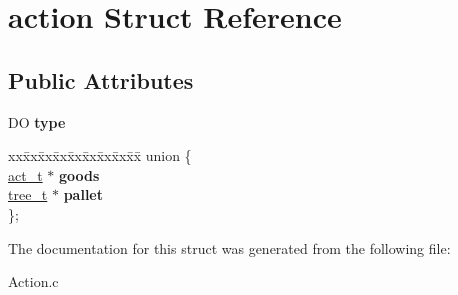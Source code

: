 \hypertarget{structaction}{}\section{action Struct Reference}
\label{structaction}
\subsection*{Public Attributes}
\begin{DoxyCompactItemize}
\item 
\hypertarget{structaction_adcdcb1b4bec8aa79b037f92903e0157a}{}D\+O {\bfseries type}\label{structaction_adcdcb1b4bec8aa79b037f92903e0157a}

\item 
\hypertarget{structaction_aae6eafa12e08fadd285f6b5a1bdc830c}{}\begin{tabbing}
xx\=xx\=xx\=xx\=xx\=xx\=xx\=xx\=xx\=\kill
union \{\\
\>\hyperlink{structact}{act\_t} $\ast$ {\bfseries goods}\\
\>\hyperlink{structtree}{tree\_t} $\ast$ {\bfseries pallet}\\
\}; \label{structaction_aae6eafa12e08fadd285f6b5a1bdc830c}
\\

\end{tabbing}\end{DoxyCompactItemize}


The documentation for this struct was generated from the following file\+:\begin{DoxyCompactItemize}
\item 
Action.\+c\end{DoxyCompactItemize}
